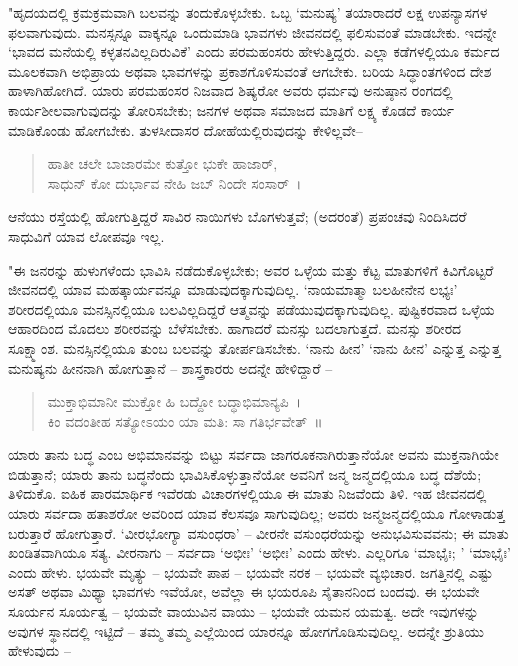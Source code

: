 "ಹೃದಯದಲ್ಲಿ ಕ್ರಮಕ್ರಮವಾಗಿ ಬಲವನ್ನು ತಂದುಕೊಳ್ಳಬೇಕು. ಒಬ್ಬ ‘ಮನುಷ್ಯ’ ತಯಾರಾದರೆ ಲಕ್ಷ ಉಪನ್ಯಾಸಗಳ ಫಲವಾಗುವುದು. ಮನಸ್ಸನ್ನೂ ವಾಕ್ಕನ್ನೂ ಒಂದುಮಾಡಿ ಭಾವಗಳು ಜೀವನದಲ್ಲಿ ಫಲಿಸುವಂತೆ ಮಾಡಬೇಕು. ಇದನ್ನೇ ‘ಭಾವದ ಮನೆಯಲ್ಲಿ ಕಳ್ಳತನವಿಲ್ಲದಿರುವಿಕೆ’ ಎಂದು ಪರಮಹಂಸರು ಹೇಳುತ್ತಿದ್ದರು. ಎಲ್ಲಾ ಕಡೆಗಳಲ್ಲಿಯೂ ಕರ್ಮದ ಮೂಲಕವಾಗಿ ಅಭಿಪ್ರಾಯ ಅಥವಾ ಭಾವಗಳನ್ನು ಪ್ರಕಾಶಗೊಳಿಸುವಂತೆ ಆಗಬೇಕು. ಬರಿಯ ಸಿದ್ಧಾಂತಗಳಿಂದ ದೇಶ ಹಾಳಾಗಿಹೋಗಿದೆ. ಯಾರು ಪರಮಹಂಸರ ನಿಜವಾದ ಶಿಷ್ಯರೋ ಅವರು ಧರ್ಮವು ಅನುಷ್ಠಾನ ರಂಗದಲ್ಲಿ ಕಾರ್ಯಶೀಲವಾಗುವುದನ್ನು ತೋರಿಸಬೇಕು; ಜನಗಳ ಅಥವಾ ಸಮಾಜದ ಮಾತಿಗೆ ಲಕ್ಷ್ಯ ಕೊಡದೆ ಕಾರ್ಯ ಮಾಡಿಕೊಂಡು ಹೋಗಬೇಕು. ತುಳಸೀದಾಸರ ದೋಹೆಯಲ್ಲಿರುವುದನ್ನು ಕೇಳಿಲ್ಲವೇ–

\begin{verse}
ಹಾತೀ ಚಲೇ ಬಾಜಾರಮೇ ಕುತ್ತೋ ಭುಕೇ ಹಾಜಾರ್,\\ಸಾಧುನ್ ಕೋ ದುರ್ಭಾವ ನೇಹಿ ಜಬ್ ನಿಂದೇ ಸಂಸಾರ್~।
\end{verse}

ಆನೆಯು ರಸ್ತೆಯಲ್ಲಿ ಹೋಗುತ್ತಿದ್ದರೆ ಸಾವಿರ ನಾಯಿಗಳು ಬೊಗಳುತ್ತವೆ; (ಅದರಂತೆ) ಪ್ರಪಂಚವು ನಿಂದಿಸಿದರೆ ಸಾಧುವಿಗೆ ಯಾವ ಲೋಪವೂ ಇಲ್ಲ.

"ಈ ಜನರನ್ನು ಹುಳುಗಳೆಂದು ಭಾವಿಸಿ ನಡೆದುಕೊಳ್ಳಬೇಕು; ಅವರ ಒಳ್ಳೆಯ ಮತ್ತು ಕೆಟ್ಟ ಮಾತುಗಳಿಗೆ ಕಿವಿಗೊಟ್ಟರೆ ಜೀವನದಲ್ಲಿ ಯಾವ ಮಹತ್ಕಾರ್ಯವನ್ನೂ ಮಾಡುವುದಕ್ಕಾಗುವುದಿಲ್ಲ. ‘ನಾಯಮಾತ್ಮಾ ಬಲಹೀನೇನ ಲಭ್ಯಃ’ ಶರೀರದಲ್ಲಿಯೂ ಮನಸ್ಸಿನಲ್ಲಿಯೂ ಬಲವಿಲ್ಲದಿದ್ದರೆ ಆತ್ಮವನ್ನು ಪಡೆಯುವುದಕ್ಕಾಗುವುದಿಲ್ಲ. ಪುಷ್ಟಿಕರವಾದ ಒಳ್ಳೆಯ ಆಹಾರದಿಂದ ಮೊದಲು ಶರೀರವನ್ನು ಬೆಳೆಸಬೇಕು. ಹಾಗಾದರೆ ಮನಸ್ಸು ಬದಲಾಗುತ್ತದೆ. ಮನಸ್ಸು ಶರೀರದ ಸೂಕ್ಷ್ಮಾಂಶ. ಮನಸ್ಸಿನಲ್ಲಿಯೂ ತುಂಬ ಬಲವನ್ನು ತೋರ್ಪಡಿಸಬೇಕು. ‘ನಾನು ಹೀನ’ ‘ನಾನು ಹೀನ’ ಎನ್ನುತ್ತ ಎನ್ನುತ್ತ ಮನುಷ್ಯನು ಹೀನನಾಗಿ ಹೋಗುತ್ತಾನೆ – ಶಾಸ್ತ್ರಕಾರರು ಅದನ್ನೇ ಹೇಳಿದ್ದಾರೆ –

\begin{verse}
ಮುಕ್ತಾಭಿಮಾನೀ ಮುಕ್ತೋ ಹಿ ಬದ್ದೋ ಬದ್ಧಾಭಿಮಾನ್ಯಪಿ~।\\ಕಿಂ ವದಂತೀಹ ಸತ್ಯೋಽಯಂ ಯಾ ಮತಿ: ಸಾ ಗತಿರ್ಭವೇತ್~॥
\end{verse}

ಯಾರು ತಾನು ಬದ್ಧ ಎಂಬ ಅಭಿಮಾನವನ್ನು ಬಿಟ್ಟು ಸರ್ವದಾ ಜಾಗರೂಕನಾಗಿರುತ್ತಾನೆಯೋ ಅವನು ಮುಕ್ತನಾಗಿಯೇ ಬಿಡುತ್ತಾನೆ; ಯಾರು ತಾನು ಬದ್ಧನೆಂದು ಭಾವಿಸಿಕೊಳ್ಳುತ್ತಾನೆಯೋ ಅವನಿಗೆ ಜನ್ಮ ಜನ್ಮದಲ್ಲಿಯೂ ಬದ್ಧ ದೆಶೆಯೆ; ತಿಳಿದುಕೊ. ಐಹಿಕ ಪಾರಮಾರ್ಥಿಕ ಇವೆರಡು ವಿಚಾರಗಳಲ್ಲಿಯೂ ಈ ಮಾತು ನಿಜವೆಂದು ತಿಳಿ. ಇಹ ಜೀವನದಲ್ಲಿ ಯಾರು ಸರ್ವದಾ ಹತಾಶರೋ ಅವರಿಂದ ಯಾವ ಕೆಲಸವೂ ಸಾಗುವುದಿಲ್ಲ; ಅವರು ಜನ್ಮಜನ್ಮದಲ್ಲಿಯೂ ಗೋಳಾಡುತ್ತ ಬರುತ್ತಾರೆ ಹೋಗುತ್ತಾರೆ. ‘ವೀರಭೋಗ್ಯಾ ವಸುಂಧರಾ’ – ವೀರನೇ ವಸುಂಧರೆಯನ್ನು ಅನುಭವಿಸುವವನು; ಈ ಮಾತು ಖಂಡಿತವಾಗಿಯೂ ಸತ್ಯ. ವೀರನಾಗು – ಸರ್ವದಾ ‘ಅಭೀಃ’ ‘ಅಭೀಃ’ ಎಂದು ಹೇಳು. ಎಲ್ಲರಿಗೂ ‘ಮಾಭೈಃ; ’ ‘ಮಾಭೈಃ’ ಎಂದು ಹೇಳು. ಭಯವೇ ಮೃತ್ಯು – ಭಯವೇ ಪಾಪ – ಭಯವೇ ನರಕ – ಭಯವೇ ವ್ಯಭಿಚಾರ. ಜಗತ್ತಿನಲ್ಲಿ ಎಷ್ಟು ಅಸತ್ ಅಥವಾ ಮಿಥ್ಯಾ ಭಾವಗಳು ಇವೆಯೋ, ಅವೆಲ್ಲಾ ಈ ಭಯರೂಪಿ ಸೈತಾನನಿಂದ ಬಂದವು. ಈ ಭಯವೇ ಸೂರ್ಯನ ಸೂರ್ಯತ್ವ – ಭಯವೇ ವಾಯುವಿನ ವಾಯು – ಭಯವೇ ಯಮನ ಯಮತ್ವ. ಅದೇ ಇವುಗಳನ್ನು ಅವುಗಳ ಸ್ಥಾನದಲ್ಲಿ ಇಟ್ಟಿದೆ – ತಮ್ಮ ತಮ್ಮ ಎಲ್ಲೆಯಿಂದ ಯಾರನ್ನೂ ಹೋಗಗೊಡಿಸುವುದಿಲ್ಲ. ಅದನ್ನೇ ಶ್ರುತಿಯು ಹೇಳುವುದು –

